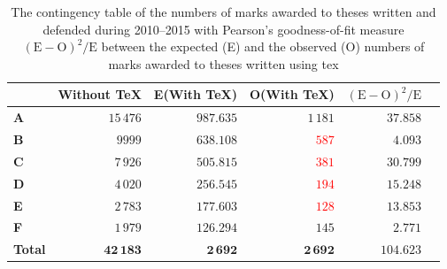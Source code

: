 \documentclass[12pt,twoside,color,table]%
  {fithesis3/fithesis3} %
\begin{document}
  \begin{table}
    \caption{The contingency table of the numbers of marks awarded
      to theses written and defended during 2010--2015 with
      Pearson's goodness-of-fit measure
      $(\text{E}-\text{O})^2/\text{E}$ between the expected (E)
      and the observed (O) numbers of marks awarded to theses
      written using \gls{tex}}
    \begin{tabularx}{\textwidth}{Xrrrrr}
      &\textbf{Without \TeX}&E(\textbf{With \TeX})
      &O(\textbf{With \TeX})&$(\text{E}-\text{O})^2/\text{E}$
      \\ \toprule
      \textbf{\parbox[t]{1em}{\centering A}} 
        &$15\,476$&$987.635$&\textcolor{OliveGreen}{$1\,181$}&
        $37.858$\\
      \textbf{\parbox[t]{1em}{\centering B}}
        &$9999$&$638.108$&\textcolor{red}{$587$}&$4.093$\\
      \textbf{\parbox[t]{1em}{\centering C}}
        &$7\,926$&$505.815$&\textcolor{red}{$381$}&$30.799$\\
      \textbf{\parbox[t]{1em}{\centering D}}
        &$4\,020$&$256.545$&\textcolor{red}{$194$}&$15.248$\\
      \textbf{\parbox[t]{1em}{\centering E}}
        &$2\,783$&$177.603$&\textcolor{red}{$128$}&$13.853$\\
      \textbf{\parbox[t]{1em}{\centering F}}
        &$1\,979$&$126.294$&\textcolor{OliveGreen}{$145$}&
        $2.771$\\
      \bottomrule
      \textbf{Total} &$\mathbf{42\,183}$&$\mathbf{2\,692}$&
        $\mathbf{2\,692}$&$\mathbf{104.623}$
    \end{tabularx}
    \label{table:statistics-contingency}
  \end{table}
\end{document}
